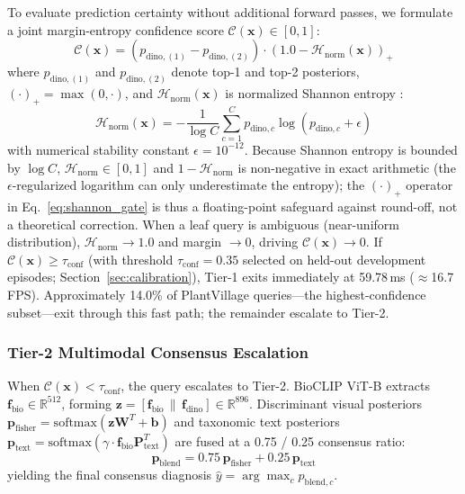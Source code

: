 \documentclass[preprint,12pt]{elsarticle}
\begin{document}
To evaluate prediction certainty without additional forward passes, we formulate a joint margin-entropy confidence score $\mathcal{C}(\mathbf{x}) \in [0, 1]$:
\begin{equation}
    \label{eq:shannon_gate}
    \mathcal{C}(\mathbf{x}) = \left(p_{\text{dino}, (1)} - p_{\text{dino}, (2)}\right) \cdot \left(1.0 - \mathcal{H}_{\text{norm}}(\mathbf{x})\right)_+
\end{equation}
where $p_{\text{dino}, (1)}$ and $p_{\text{dino}, (2)}$ denote top-1 and top-2 posteriors, $(\cdot)_+ = \max(0, \cdot)$, and $\mathcal{H}_{\text{norm}}(\mathbf{x})$ is normalized Shannon entropy \cite{shannon1948mathematical}:
\begin{equation}
    \mathcal{H}_{\text{norm}}(\mathbf{x}) = -\frac{1}{\log C} \sum_{c=1}^C p_{\text{dino}, c} \log(p_{\text{dino}, c} + \epsilon)
\end{equation}
with numerical stability constant $\epsilon = 10^{-12}$. Because Shannon entropy is bounded by $\log C$, $\mathcal{H}_{\text{norm}} \in [0,1]$ and $1-\mathcal{H}_{\text{norm}}$ is non-negative in exact arithmetic (the $\epsilon$-regularized logarithm can only underestimate the entropy); the $(\cdot)_+$ operator in Eq.~\eqref{eq:shannon_gate} is thus a floating-point safeguard against round-off, not a theoretical correction. When a leaf query is ambiguous (near-uniform distribution), $\mathcal{H}_{\text{norm}} \to 1.0$ and margin $\to 0$, driving $\mathcal{C}(\mathbf{x}) \to 0$. If $\mathcal{C}(\mathbf{x}) \ge \tau_{\text{conf}}$ (with threshold $\tau_{\text{conf}} = 0.35$ selected on held-out development episodes; Section~\ref{sec:calibration}), Tier-1 exits immediately at 59.78\,ms ($\approx$16.7\,FPS). Approximately 14.0\% of PlantVillage queries---the highest-confidence subset---exit through this fast path; the remainder escalate to Tier-2.

\subsubsection{Tier-2 Multimodal Consensus Escalation}
When $\mathcal{C}(\mathbf{x}) < \tau_{\text{conf}}$, the query escalates to Tier-2. BioCLIP ViT-B extracts $\mathbf{f}_{\text{bio}} \in \mathbb{R}^{512}$, forming $\mathbf{z} = [\mathbf{f}_{\text{bio}} \,\|\, \mathbf{f}_{\text{dino}}] \in \mathbb{R}^{896}$. Discriminant visual posteriors $\mathbf{p}_{\text{fisher}} = \text{softmax}(\mathbf{z}\mathbf{W}^T + \mathbf{b})$ and taxonomic text posteriors $\mathbf{p}_{\text{text}} = \text{softmax}(\gamma \cdot \mathbf{f}_{\text{bio}}\mathbf{P}_{\text{text}}^T)$ are fused at a 0.75 / 0.25 consensus ratio:
\begin{equation}
    \label{eq:multimodal_blend}
    \mathbf{p}_{\text{blend}} = 0.75 \, \mathbf{p}_{\text{fisher}} + 0.25 \, \mathbf{p}_{\text{text}}
\end{equation}
yielding the final consensus diagnosis $\hat{y} = \arg\max_c p_{\text{blend}, c}$.
\end{document}
